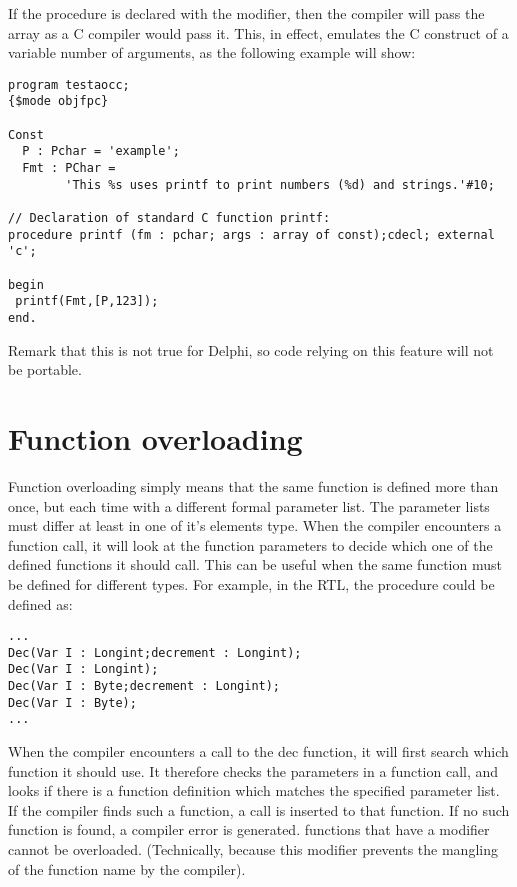 If the procedure is declared with the  modifier, then the
compiler will pass the array as a C compiler would pass it. This, in effect,
emulates the C construct of a variable number of arguments, as the following
example will show:
\begin{verbatim}
program testaocc;
{$mode objfpc}

Const
  P : Pchar = 'example';
  Fmt : PChar =
        'This %s uses printf to print numbers (%d) and strings.'#10;

// Declaration of standard C function printf:
procedure printf (fm : pchar; args : array of const);cdecl; external 'c';

begin
 printf(Fmt,[P,123]);
end.
\end{verbatim}
Remark that this is not true for Delphi, so code relying on this feature
will not be portable.

\section{Function overloading}
Function overloading simply means that the same function is defined more
than once, but each time with a different formal parameter list.
The parameter lists must differ at least in one of it's elements type.
When the compiler encounters a function call, it will look at the function
parameters to decide which one of the defined functions it should call.
This can be useful when the same function must be defined for different
types. For example, in the RTL, the   procedure could be
 defined as:
\begin{verbatim}
...
Dec(Var I : Longint;decrement : Longint);
Dec(Var I : Longint);
Dec(Var I : Byte;decrement : Longint);
Dec(Var I : Byte);
...
\end{verbatim}
When the compiler encounters a call to the dec function, it will first search
which function it should use. It therefore checks the parameters in a
function call, and looks if there is a function definition which matches the
specified parameter list. If the compiler finds such a function, a call is
inserted to that function. If no such function is found, a compiler error is
generated.
functions that have a  modifier cannot be overloaded.
(Technically, because this modifier prevents the mangling of
the function name by the compiler).

